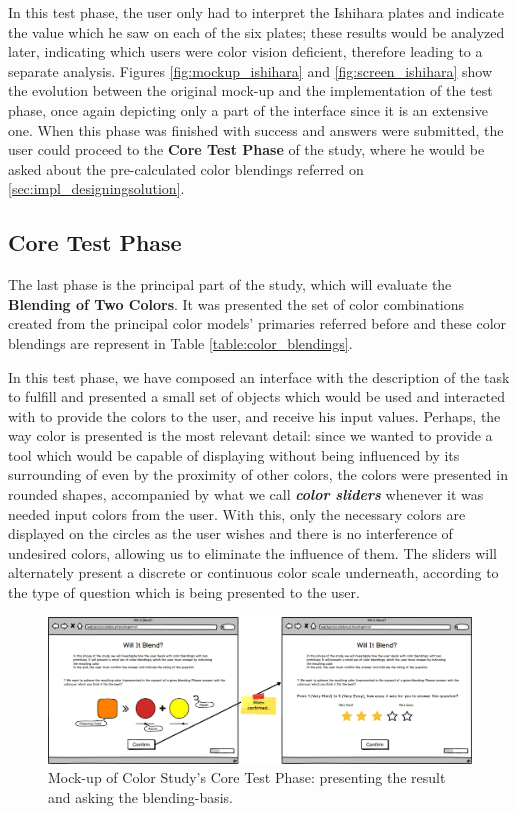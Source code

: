 %
In this test phase, the user only had to interpret the Ishihara plates and indicate the value which he saw on each of the six plates; these results would be
analyzed later, indicating which users were color vision deficient, therefore leading to a separate analysis. Figures \ref{fig:mockup_ishihara} and
\ref{fig:screen_ishihara} show the evolution between the original mock-up and the implementation of the test phase, once again depicting only a part of the
interface since it is an extensive one.
%
When this phase was finished with success and answers were submitted, the user could proceed to the \textbf{Core Test Phase} of the study, where he would be asked
about the pre-calculated color blendings referred on \ref{sec:impl_designingsolution}.
%
%
\subsection{Core Test Phase}
\label{subsec:design_core}
%
The last phase is the principal part of the study, which will evaluate the \textbf{Blending of Two Colors}. It was presented the set of color combinations
created from the principal color models' primaries referred before and these color blendings are represent in Table \ref{table:color_blendings}. \par
%
In this test phase, we have composed an interface with the description of the task to fulfill and presented a small set of objects which would be used and
interacted with to provide the colors to the user, and receive his input values. Perhaps, the way color is presented is the most relevant detail: since we
wanted to provide a tool which would be capable of displaying without being influenced by its surrounding of even by the proximity of other colors, the colors
were presented in rounded shapes, accompanied by what we call \emph{\textbf{color sliders}} whenever it was needed input colors from the user. With this,
only the necessary colors are displayed on the circles as the user wishes and there is no interference of undesired colors, allowing us to eliminate the
influence of them. The sliders will alternately present a discrete or continuous color scale underneath, according to the type of question which is being
presented to the user. \par
%
\begin{figure}[htbp]
	\centering
  \includegraphics[width=\textwidth]{images/implementation/mockup_core_objTwoColors.png}
  \caption[Mock-up of Color Study's Core Test Phase: present the result and ask the blending-basis.]{Mock-up of Color Study's Core
	Test Phase: presenting the result and asking the blending-basis.}
  \label{fig:mockup_core_1}
\end{figure} \par
